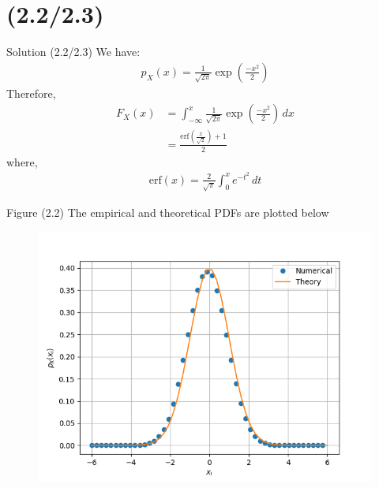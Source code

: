 \documentclass{beamer}
\begin{document}
\section{(2.2/2.3)}
\begin{frame}{Solution (2.2/2.3)}
    We have:
	\begin{align}
		p_X(x) = \frac{1}{\sqrt{2\pi}}\exp{\left(\frac{-x^2}{2}\right)} 
	\end{align}
    Therefore,
    \begin{align}
		F_X(x) &= \int_{-\infty}^{x} \frac{1}{\sqrt{2\pi}}\exp{\left(\frac{-x^2}{2}\right)} \,dx \\
        &= \frac{\text{erf}\left(\frac{x}{\sqrt{2}}\right)+1}{2}
	\end{align}
    where,
    \begin{align}
        \text{erf}(x) = \frac{2}{\sqrt{\pi}} \int _0 ^x e^{-t^2} \,dt 
    \end{align}
\end{frame}

\begin{frame}{Figure (2.2)}
    The empirical and theoretical PDFs are plotted below
	\begin{figure}
		\centerline{\includegraphics[width=\textheight]{./figures/PDF_gau.png}}
		\label{fig2}
	\end{figure}	
\end{frame}
\end{document}
